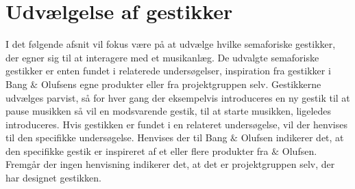 \section{Udvælgelse af gestikker}
\label{UdvaelgelseAfGestikker}
%
I det følgende afsnit vil fokus være på at udvælge hvilke semaforiske gestikker, der egner sig til at interagere med et musikanlæg. De udvalgte semaforiske gestikker er enten fundet i relaterede undersøgelser, inspiration fra gestikker i Bang $\&$ Olufsens egne produkter eller fra projektgruppen selv. Gestikkerne udvælges parvist, så for hver gang der eksempelvis introduceres en ny gestik til at pause musikken så vil en modsvarende gestik, til at starte musikken, ligeledes introduceres. Hvis gestikken er fundet i en relateret undersøgelse, vil der henvises til den specifikke undersøgelse. Henvises der til Bang $\&$ Olufsen indikerer det, at den specifikke gestik er inspireret af et eller flere produkter fra $\&$ Olufsen. Fremgår der ingen henvisning indikerer det, at det er projektgruppen selv, der har designet gestikken.  


